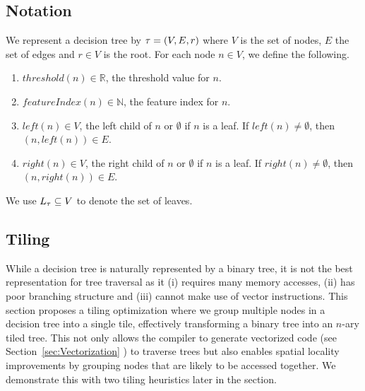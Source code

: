 \subsection{Notation}
We represent a decision tree by $\operatorname{\tau} = (V, E, r)$ where $V$ is the set of nodes, $E$ the set of edges and
$r \in V$ is the root. For each node $n \in V$, we define the following.
\begin{enumerate}
    \item $threshold(n) \in \mathbb{R}$, the threshold value for $n$.
    \item $featureIndex(n) \in \mathbb{N}$, the feature index for $n$.
    \item $left(n) \in V$, the left child of $n$ or $\emptyset$ if $n$ is a leaf. If $left(n) \neq \emptyset$, then $(n, left(n)) \in E$.
    \item $right(n) \in V$, the right child of $n$ or $\emptyset$ if $n$ is a leaf. If $right(n) \neq \emptyset$, then $(n, right(n)) \in E$.
\end{enumerate}
We use $L_{\operatorname{\tau}} \subseteq V$ to denote the set of leaves. %

\subsection{Tiling}
\label{sec:Tiling}

While a decision tree is naturally represented by a binary tree, 
it is not the best representation for tree traversal as it (i) requires many memory accesses, 
(ii) has poor branching structure and (iii) cannot make use of vector instructions. 
This section proposes a tiling optimization where we group multiple nodes in a decision tree into a single tile, effectively transforming a binary tree into an $n$-ary tiled tree. This not only allows the compiler to generate vectorized code (see Section~\ref{sec:Vectorization} ) to traverse trees but also enables spatial locality improvements by grouping nodes that are likely to be accessed together. We demonstrate this with two tiling heuristics later in the section. 



